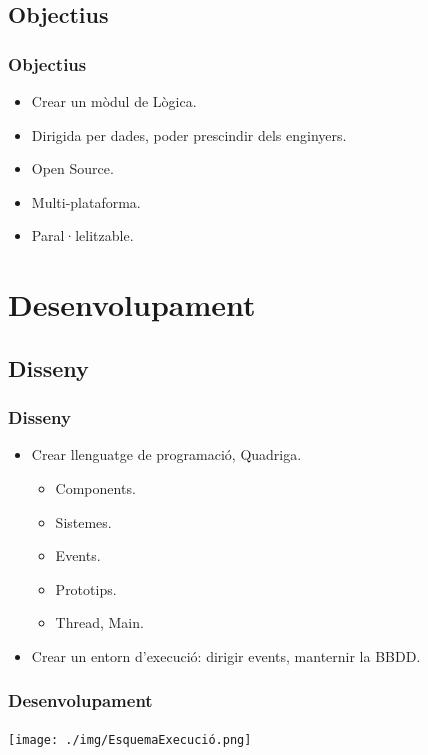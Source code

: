 \documentclass[serif,9pt]{beamer}
\begin{document}
  \subsection{Objectius}

    \begin{frame}\frametitle{Objectius}
      \begin{itemize}
        \item Crear un mòdul de Lògica. \pause
        \item Dirigida per dades, poder prescindir dels enginyers. \pause
        \item Open Source. \pause
        \item Multi-plataforma. \pause
        \item Paral·lelitzable.
      \end{itemize}
    \end{frame}

\section{Desenvolupament}

  \subsection{Disseny}

    \begin{frame}\frametitle{Disseny}
      \begin{itemize}
        \item Crear llenguatge de programació, Quadriga. \pause\medskip
        \begin{itemize}
          \item Components.\pause
          \item Sistemes.\pause
          \item Events.\pause
          \item Prototips.\pause
          \item Thread, Main.
        \end{itemize}\pause
        \item Crear un entorn d'execució: dirigir events, manternir la BBDD.
      \end{itemize}
    \end{frame}
  
    \begin{frame}\frametitle{Desenvolupament}
      \texttt{[image: ./img/EsquemaExecució.png]}
    \end{frame}
\end{document}
